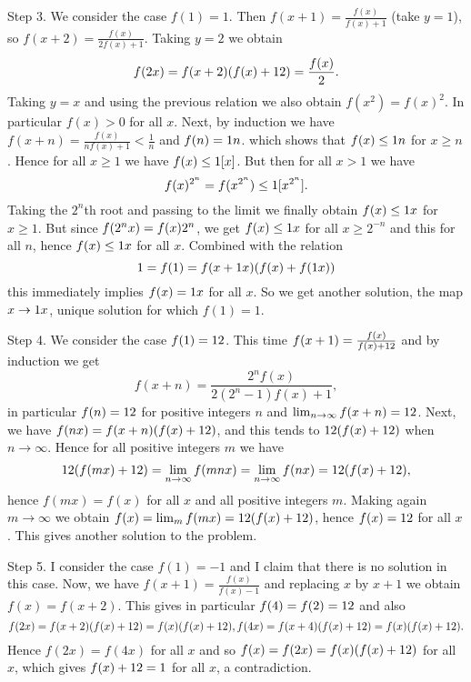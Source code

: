 \begin{solution}
     Step 3. We consider the case $f(1)=1$. Then $f(x+1)=\frac{f(x)}{f(x)+1}$ (take $y=1$),
     so $f(x+2)=\frac{f(x)}{2f(x)+1}$. Taking $y=2$ we obtain 
     \[f(2x)=f(x+2)(f(x)+1\/2)=\frac{f(x)}{2}.\]
     Taking $y=x$ and using the previous relation we also obtain $f(x^2)=f(x)^2$. In particular 
     $f(x)>0$ for all $x$. Next, by induction we have $f(x+n)=\frac{f(x)}{nf(x)+1}<\frac{1}{n}$ and $f(n)=1\/n$.
     which shows that $f(x)\leq 1\/n$ for $x\geq n$. Hence for all $x\geq 1$ we have $f(x)\leq 1\/[x]$. 
     But then for all $x>1$ we have \[f(x)^{2^n}=f(x^{2^n})\leq 1\/[x^{2^n}].\]
       Taking the $2^n$th root and passing to the limit we finally obtain $f(x)\leq 1\/x$ for 
       $x\geq 1$. But since $f(2^n x)= f(x)\/2^n$, we get $f(x)\leq 1\/x$ for all $x\geq 2^{-n}$ and this for all 
       $n$, hence $f(x)\leq 1\/x$ for all $x$. Combined with the relation 
       \[ 1=f(1)= f(x+1\/x)(f(x)+f(1\/x))\]
       this immediately implies $f(x)=1\/x$ for all $x$. So we get another solution, the map 
       $x\to 1\/x$, unique solution for which $f(1)=1$.
       
       Step 4.  We consider the case $f(1)=1\/2$. This time 
       $f(x+1)= \frac{f(x)}{f(x)+1\/2}$ and by induction we get 
       \[f(x+n)=\frac{2^n f(x)}{2 (2^n-1) f(x)+1},\]
       in particular $f(n)=1\/2$ for positive integers $n$ and 
       $\lim_{n\to\infty} f(x+n)=1\/2$. Next, we have        
       $f(nx)= f(x+n)(f(x)+1\/2)$, and this tends to $ 1\/2 (f(x)+1\/2)$ when 
       $n\to\infty$. Hence for all positive integers $m$ we have 
       \[ 1\/2 ( f(mx)+1\/2)=\lim_{n\to\infty} f(mnx)=\lim_{n\to\infty} f(nx)=
       1\/2(f(x)+1\/2),\]
        hence $f(mx)=f(x)$ for all $x$ and all positive integers $m$. Making again 
        $m\to\infty$ we obtain $f(x)=\lim_{m} f(mx)= 1\/2 (f(x)+1\/2)$, hence 
        $f(x)=1\/2$ for all $x$. This gives another solution to the problem.
        
       Step 5. I consider the case $f(1)=-1$ and I claim that there is no solution in this case. 
       Now, we have $f(x+1)= \frac{f(x)}{f(x)-1}$ and replacing $x$ by $x+1$ we obtain
       $f(x)=f(x+2)$. This gives in particular $f(4)=f(2)=1\/2$ and also 
       \[ f(2x)= f(x+2)(f(x)+1\/2)=f(x) (f(x)+1\/2),  f(4x)=f(x+4)(f(x)+1\/2)=f(x) (f(x)+1\/2).\]
       Hence $f(2x)=f(4x)$ for all $x$ and so $f(x)=f(2x)=f(x)(f(x)+1\/2)$ for all $x$, which gives 
       $f(x)+1\/2=1$ for all $x$, a contradiction.
\end{solution}



